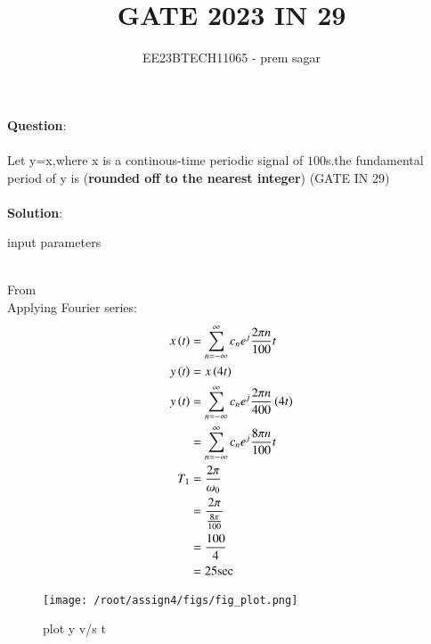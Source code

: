 \documentclass[journal,12pt,twocolumn]{IEEEtran}
\theoremstyle{remark}
\begin{document}

\vspace{3cm}

\title{GATE 2023 IN 29}
\author{EE23BTECH11065 - prem sagar}
\maketitle
\newpage

\bigskip 

\renewcommand{\thefigure}{\theenumi}
\renewcommand{\thetable}{\theenumi}
\textbf{Question}:
\\\\Let y=x,where x is a continous-time periodic signal of $100$s.the fundamental period of y is (\textbf{rounded off to the nearest integer})
 \hfill(GATE IN 29)
 \\\\\textbf{Solution}:
\begin{table}[!ht]
\def\arraystretch{1.5}
   \centering
    \renewcommand\thetable{1}
      
    \caption{input parameters}
    \label{tab:IN 29}
 \end{table}
\\From {}
\\Applying Fourier series:
 \begin{align}
 x\left(t\right)&=\sum_{n=-\infty}^{\infty}c_ne^j\frac{2\pi n}{100}t
\\ y\left(t\right)&=x\left(4t\right)
\\ y\left(t\right)&=\sum_{n=-\infty}^{\infty}c_ne^j\frac{2\pi n}{400}\left(4t\right)
\\&=\sum_{n=-\infty}^{\infty}c_ne^j\frac{8\pi n}{100}t
\\T_1&=\frac{2\pi}{\omega_0}
\\&=\frac{2\pi}{\frac{8\pi}{100}}
\\&=\frac{100}{4}
\\&=25\text{sec}
 \end{align}
\begin{figure}[h]
 \renewcommand\thefigure{1}
    \centering
    \texttt{[image: /root/assign4/figs/fig\_plot.png]}
    \caption{plot y v/s t}
    \label{fig:enter-label}
\end{figure}
\end{document}
